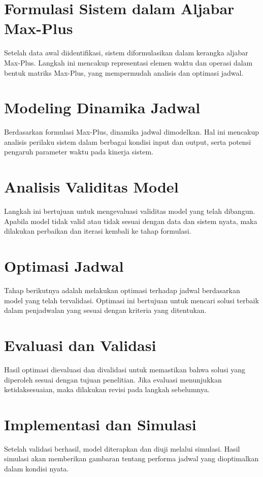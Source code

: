 \documentclass{file/TA-ITS}
\theoremstyle{definition}
\theoremstyle{definition}
\theoremstyle{plain}
\begin{document}
\section{Formulasi Sistem dalam Aljabar Max-Plus}
Setelah data awal diidentifikasi, sistem diformulasikan dalam kerangka aljabar Max-Plus. Langkah ini mencakup representasi elemen waktu dan operasi dalam bentuk matriks Max-Plus, yang mempermudah analisis dan optimasi jadwal.

\section{Modeling Dinamika Jadwal}
Berdasarkan formulasi Max-Plus, dinamika jadwal dimodelkan. Hal ini mencakup analisis perilaku sistem dalam berbagai kondisi input dan output, serta potensi pengaruh parameter waktu pada kinerja sistem.

\section{Analisis Validitas Model}
Langkah ini bertujuan untuk mengevaluasi validitas model yang telah dibangun. Apabila model tidak valid atau tidak sesuai dengan data dan sistem nyata, maka dilakukan perbaikan dan iterasi kembali ke tahap formulasi.

\section{Optimasi Jadwal}
Tahap berikutnya adalah melakukan optimasi terhadap jadwal berdasarkan model yang telah tervalidasi. Optimasi ini bertujuan untuk mencari solusi terbaik dalam penjadwalan yang sesuai dengan kriteria yang ditentukan.

\section{Evaluasi dan Validasi}
Hasil optimasi dievaluasi dan divalidasi untuk memastikan bahwa solusi yang diperoleh sesuai dengan tujuan penelitian. Jika evaluasi menunjukkan ketidaksesuaian, maka dilakukan revisi pada langkah sebelumnya.

\section{Implementasi dan Simulasi}
Setelah validasi berhasil, model diterapkan dan diuji melalui simulasi. Hasil simulasi akan memberikan gambaran tentang performa jadwal yang dioptimalkan dalam kondisi nyata.
\end{document}
